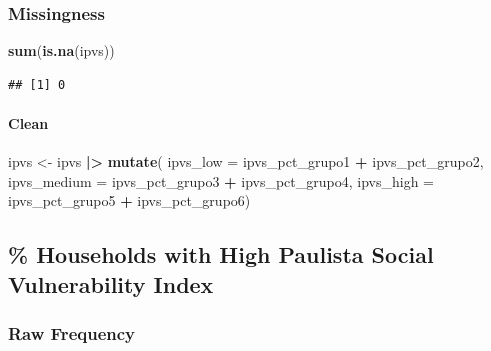 \documentclass[
]{article}
\newenvironment{Shaded}{\begin{snugshade}}{\end{snugshade}}
\newcommand{\AttributeTok}[1]{\textcolor[rgb]{0.13,0.29,0.53}{#1}}
\newcommand{\FunctionTok}[1]{\textcolor[rgb]{0.13,0.29,0.53}{\textbf{#1}}}
\newcommand{\NormalTok}[1]{#1}
\newcommand{\OtherTok}[1]{\textcolor[rgb]{0.56,0.35,0.01}{#1}}
\newcommand{\SpecialCharTok}[1]{\textcolor[rgb]{0.81,0.36,0.00}{\textbf{#1}}}
\begin{document}
\subsubsection{Missingness}\label{missingness}

\begin{Shaded}
\begin{Highlighting}[]
\FunctionTok{sum}\NormalTok{(}\FunctionTok{is.na}\NormalTok{(ipvs))}
\end{Highlighting}
\end{Shaded}

\begin{verbatim}
## [1] 0
\end{verbatim}

\paragraph{Clean}\label{clean}

\begin{Shaded}
\begin{Highlighting}[]
\NormalTok{ipvs }\OtherTok{\textless{}{-}}\NormalTok{ ipvs }\SpecialCharTok{|\textgreater{}}
  \FunctionTok{mutate}\NormalTok{(}
    \AttributeTok{ipvs\_low =} 
\NormalTok{      ipvs\_pct\_grupo1 }\SpecialCharTok{+}\NormalTok{ ipvs\_pct\_grupo2,}
    \AttributeTok{ipvs\_medium =}
\NormalTok{      ipvs\_pct\_grupo3 }\SpecialCharTok{+}\NormalTok{ ipvs\_pct\_grupo4,}
    \AttributeTok{ipvs\_high =}
\NormalTok{      ipvs\_pct\_grupo5 }\SpecialCharTok{+}\NormalTok{ ipvs\_pct\_grupo6)}
\end{Highlighting}
\end{Shaded}

\subsection{\% Households with High Paulista Social Vulnerability
Index}\label{households-with-high-paulista-social-vulnerability-index}

\subsubsection{Raw Frequency}\label{raw-frequency}

\begin{Shaded}
\end{Shaded}
\end{document}
